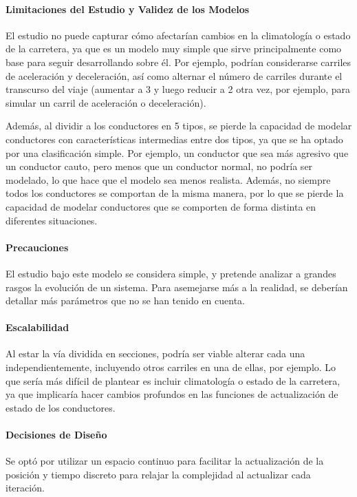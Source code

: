 \paragraph{Limitaciones del Estudio y Validez de los Modelos}
El estudio no puede capturar cómo afectarían cambios en la climatología o estado de la carretera, ya que es un modelo muy simple que sirve principalmente como base para seguir desarrollando sobre él. Por ejemplo, podrían considerarse carriles de aceleración y deceleración, así como alternar el número de carriles durante el transcurso del viaje (aumentar a 3 y luego reducir a 2 otra vez, por ejemplo, para simular un carril de aceleración o deceleración).

Además, al dividir a los conductores en 5 tipos, se pierde la capacidad de modelar conductores con características intermedias entre dos tipos, ya que se ha optado por una clasificación simple. Por ejemplo, un conductor que sea más agresivo que un conductor cauto, pero menos que un conductor normal, no podría ser modelado, lo que
hace que el modelo sea menos realista. Además, no siempre todos los conductores se comportan de la misma manera, por lo que se pierde la capacidad de modelar conductores que se comporten de forma distinta en diferentes situaciones.

\paragraph{Precauciones}
El estudio bajo este modelo se considera simple, y pretende analizar a grandes rasgos la evolución de un sistema. Para asemejarse más a la realidad, se deberían detallar más parámetros que no se han tenido en cuenta.

\paragraph{Escalabilidad}
Al estar la vía dividida en secciones, podría ser viable alterar cada una independientemente, incluyendo otros carriles en una de ellas, por ejemplo. Lo que sería más difícil de plantear es incluir climatología o estado de la carretera, ya que implicaría hacer cambios profundos en las funciones de actualización de estado de los conductores.

\paragraph{Decisiones de Diseño}
Se optó por utilizar un espacio continuo para facilitar la actualización de la posición y tiempo discreto para relajar la complejidad al actualizar cada iteración.
